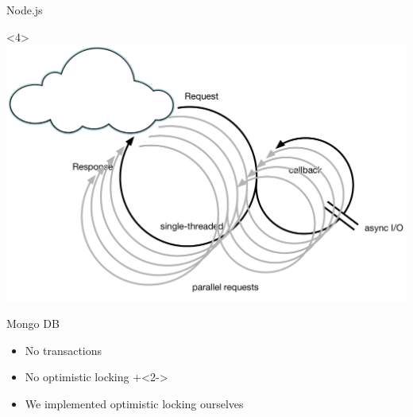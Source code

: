 \begin{frame}[fragile]{Node.js}
\begin{onlyenv}<4>
\includegraphics[width=.7\textwidth]{../Nodejs4.pdf}
\end{onlyenv}

\hfill 

\begin{tiny}
\end{tiny}

\end{frame}

\begin{frame}[fragile]{Mongo DB}

\begin{itemize}
\item No transactions
\item No optimistic locking
\onslide+<2->
\item We implemented optimistic locking ourselves
\end{itemize}

\end{frame}

